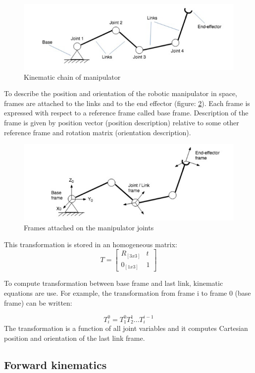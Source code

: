 \begin{figure} [!ht]
    \centering
    \includegraphics[width=0.65\linewidth]{images/chain.png}
    \caption{Kinematic chain of manipulator}
    \label{pict:chain}
\end{figure}

To describe the position and orientation of the robotic manipulator in space, frames are attached to the links and to the end effector (figure: \ref{pict:frames}). Each frame is expressed with respect to a reference frame called base frame. Description of the frame is given by position vector (position description) relative to some other reference frame and rotation matrix (orientation description).

\begin{figure} [!ht]
    \centering
    \includegraphics[width=0.65\linewidth]{images/frames.png}
    \caption{Frames attached on the manipulator joints}
    \label{pict:frames}
\end{figure}
This transformation is stored in an homogeneous matrix:
\[
T
=
\begin{bmatrix}
    R_{[3x3]} & t \\
    0_{[1x3]} & 1
\end{bmatrix}
\]

To compute transformation between base frame and last link, kinematic equations are use. For example, the transformation from frame {i} to frame {0} (base frame) can be written:

\begin{equation}
    T_i^0=T_1^0 T_2^1 ... T_i^{i-1}
\end{equation}
The transformation is a function of all joint variables and it computes Cartesian position and orientation of the last link frame.

\subsection{Forward kinematics}
\label{chap:forwardkinematics}


